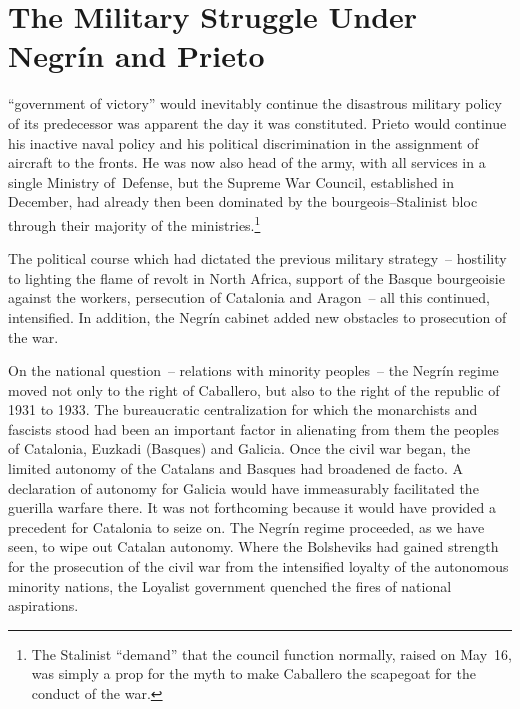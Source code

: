 \chapter[Military Struggle Under Negr\'in and Prieto]{The Military Struggle Under \\ Negr\'in and Prieto}

\indexIPrieto{}\indexJNegrin
{} ``government of victory'' would inevitably continue the disastrous military policy of its predecessor was apparent the day it was constituted. Prieto would continue his inactive naval policy and his political discrimination in the assignment of aircraft to the fronts. He was now also head of the army, with all services in a single Ministry of~Defense, but the Supreme War Council, established in December\kn, had already then been dominated by the bourgeois--Stalinist bloc through their majority of the ministries.\kn\kn\footnote{The Stalinist ``demand'' that the council function normally\kn, raised on May~16, was simply a prop for the myth to make Caballero the scapegoat for the conduct of the war\kn.}

The political course which had dictated the previous military stra\-te\-gy~-- hostility to lighting the flame of revolt in North Africa, support of the Basque bourgeoisie against the workers, persecution of Catalonia and Aragon~-- all this continued, intensified. In addition, the Negr\'in cabinet added new obstacles to prosecution of the war.

On the national question~-- relations with minority peoples~-- the Negr\'in regime moved not only to the right of Caballero, but also to the right of the republic of 1931 to 1933. The bureaucratic centralization for which the monarchists and fascists stood had been an important factor in alienating from them the peoples of Catalonia, Euzkadi (Basques) and Galicia. Once the civil war began, the limited autonomy of the Catalans and Basques had broadened de facto. A declaration of autonomy for Galicia would have immeasurably facilitated the guerilla warfare there. It was not forthcoming because it would have provided a precedent for Catalonia to seize on. The Neg\-r\'in regime proceeded, as we have seen, to wipe out Catalan autonomy. Where the Bolsheviks had gained strength for the prosecution of the civil war from the intensified loyalty of the autonomous minority nations\kn, the Loyalist government quenched the fires of national aspirations.

